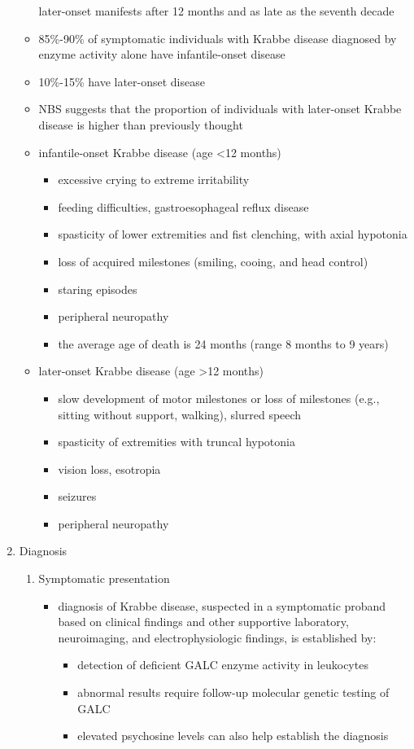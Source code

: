 \documentclass{scrartcl}
\begin{document}
\begin{enumerate}
\begin{itemize}
\item[{later-onset}] manifests after 12 months and as late as the seventh
decade

\item 85\%-90\% of symptomatic individuals with Krabbe disease diagnosed by enzyme activity alone have infantile-onset disease
\item 10\%-15\% have later-onset disease
\item NBS suggests that the proportion of individuals with later-onset
Krabbe disease is higher than previously thought

\item infantile-onset Krabbe disease (age <12 months)
\begin{itemize}
\item excessive crying to extreme irritability
\item feeding difficulties, gastroesophageal reflux disease
\item spasticity of lower extremities and fist clenching, with axial hypotonia
\item loss of acquired milestones (smiling, cooing, and head control)
\item staring episodes
\item peripheral neuropathy
\item the average age of death is 24 months (range 8 months to 9 years)
\end{itemize}

\item later-onset Krabbe disease (age >12 months)
\begin{itemize}
\item slow development of motor milestones or loss of milestones (e.g.,
sitting without support, walking), slurred speech
\item spasticity of extremities with truncal hypotonia
\item vision loss, esotropia
\item seizures
\item peripheral neuropathy
\end{itemize}
\end{itemize}

\item Diagnosis
\label{sec:orgc944287}
\begin{enumerate}
\item Symptomatic presentation
\label{sec:orge599d16}
\begin{itemize}
\item diagnosis of Krabbe disease, suspected in a symptomatic proband
based on clinical findings and other supportive laboratory,
neuroimaging, and electrophysiologic findings, is established by:
\begin{itemize}
\item detection of deficient GALC enzyme activity in leukocytes
\item abnormal results require follow-up molecular genetic testing of GALC
\item elevated psychosine levels can also help establish the diagnosis
\end{itemize}
\end{itemize}


\end{enumerate}
\end{enumerate}
\end{document}
